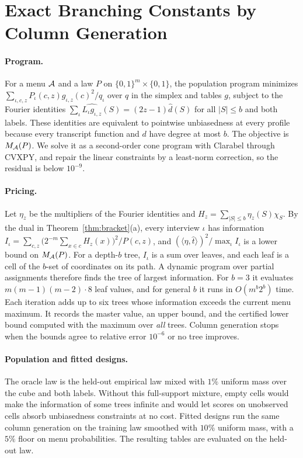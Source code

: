 \section{Exact Branching Constants by Column Generation}\label{app:forestexact}
\paragraph{Program.}
For a menu $\mathcal A$ and a law $P$ on $\{0,1\}^m\times\{0,1\}$, the population program minimizes $\sum_{\iota,c,z}P_\iota(c,z)g_{\iota,z}(c)^2/q_\iota$ over $q$ in the simplex and tables $g$, subject to the Fourier identities $\sum_\iota\widehat{L_\iota g_{\iota,z}}(S)=(2z-1)\widehat d(S)$ for all $|S|\le b$ and both labels. These identities are equivalent to pointwise unbiasedness at every profile because every transcript function and $d$ have degree at most $b$. The objective is $M_\mathcal A(P)$. We solve it as a second-order cone program with Clarabel through CVXPY, and repair the linear constraints by a least-norm correction, so the residual is below $10^{-9}$.

\paragraph{Pricing.}
Let $\eta_z$ be the multipliers of the Fourier identities and $H_z=\sum_{|S|\le b}\eta_z(S)\chi_S$. By the dual in Theorem~\ref{thm:bracket}(a), every interview $\iota$ has information $I_\iota=\sum_{c,z}\big(2^{-m}\sum_{x\in c}H_z(x)\big)^2/P(c,z)$, and $(\langle\eta,\widehat t\rangle)^2/\max_\iota I_\iota$ is a lower bound on $M_\mathcal A(P)$. For a depth-$b$ tree, $I_\iota$ is a sum over leaves, and each leaf is a cell of the $b$-set of coordinates on its path. A dynamic program over partial assignments therefore finds the tree of largest information. For $b=3$ it evaluates $m(m-1)(m-2)\cdot8$ leaf values, and for general $b$ it runs in $O(m^b2^b)$ time. Each iteration adds up to six trees whose information exceeds the current menu maximum. It records the master value, an upper bound, and the certified lower bound computed with the maximum over \emph{all} trees. Column generation stops when the bounds agree to relative error $10^{-6}$ or no tree improves.

\paragraph{Population and fitted designs.}
The oracle law is the held-out empirical law mixed with $1\%$ uniform mass over the cube and both labels. Without this full-support mixture, empty cells would make the information of some trees infinite and would let scores on unobserved cells absorb unbiasedness constraints at no cost. Fitted designs run the same column generation on the training law smoothed with $10\%$ uniform mass, with a $5\%$ floor on menu probabilities. The resulting tables are evaluated on the held-out law.

